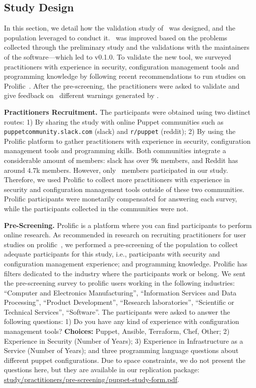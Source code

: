 \subsection{Study Design}

In this section, we detail how the validation study of \toolname\ 
was designed, and the population leveraged to conduct it.
\toolname\ was improved based on the problems collected through 
the preliminary study and the validations with the maintainers 
of the software---which led to \toolname{} v0.1.0. To validate the new tool, 
we surveyed practitioners with experience in security, configuration management 
tools and programming knowledge by following 
recent recommendations to run studies on Prolific~\cite{arxiv.2201.05348}. 
After the pre-screening, the practitioners 
were asked to validate and give feedback on \noWarningsPerPracticioner\ different 
warnings generated by \toolname.

\textbf{Practitioners Recruitment.} The participants were obtained using
two distinct routes: 1) By sharing the study with online Puppet communities such as 
    \texttt{puppetcommunity.slack.com} (slack) and \texttt{r/puppet} (reddit); 2) By using the Prolific platform to gather practitioners with 
    experience in security, configuration management tools and programming skills.
Both communities integrate a considerable amount of members: slack has 
over $9$k members, and Reddit has around $4.7$k members. However, only \noProfessionalsCommunity\ 
members participated in our study.
Therefore, we used Prolific to collect more practitioners with experience in security 
and configuration management tools outside of these two communities. 
Prolific participants were monetarily compensated for answering each survey, while the 
participants collected in the communities were not.

\textbf{Pre-Screening.} Prolific 
is a platform where you can find participants to perform online research. As recommended 
in research on recruiting practitioners for user studies on prolific~\cite{arxiv.2201.05348}, we performed 
a pre-screening of the population to collect adequate participants for this study, 
i.e., participants with security and configuration management experience; and 
programming knowledge. Prolific has filters dedicated to the industry where the 
participants work or belong. We sent the pre-screening survey to prolific 
users working in the following industries: ``Computer and Electronics Manufacturing'',
``Information Services and Data Processing'', ``Product Development'',
``Research laboratories'', ``Scientific or Technical Services'',
``Software''. The participants were asked to answer the following questions:
1) Do you have any kind of experience with configuration management tools?
\textbf{Choices:} Puppet, Ansible, Terraform, Chef, Other;
2) Experience in Security (Number of Years); 
3) Experience in Infrastructure as a Service (Number of Years);
and three programming language questions about different puppet
configurations. Due to space constraints, we do not present the
questions here, but they are available in our replication 
package: \url{study/practitioners/pre-screening/puppet-study-form.pdf}. 

